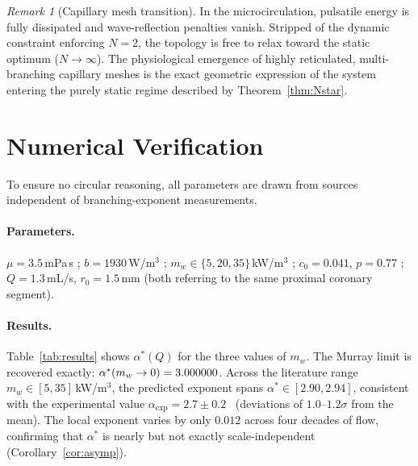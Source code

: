 \documentclass[11pt,a4paper]{article}
\theoremstyle{remark}
\newtheorem{remark}{Remark}
\begin{document}
\begin{remark}[Capillary mesh transition]
\label{rem:capillary_crossover}
In the microcirculation, pulsatile energy is fully dissipated and wave-reflection
penalties vanish. Stripped of the dynamic constraint enforcing $N=2$, the topology
is free to relax toward the static optimum ($N \to \infty$). The physiological
emergence of highly reticulated, multi-branching capillary meshes is the exact
geometric expression of the system entering the purely static regime described by
Theorem~\ref{thm:Nstar}.
\end{remark}

\section{Numerical Verification}
\label{sec:numerical}

To ensure no circular reasoning, all parameters are drawn from sources
independent of branching-exponent measurements.

\paragraph{Parameters.}
$\mu=3.5$\,mPa\,s \cite{Caro2012};
$b=1930$\,W/$\mathrm{m}^3$ \cite{Murray1926,Taber1998};
$m_w\in\{5,20,35\}$\,kW/$\mathrm{m}^3$ \cite{Paul1980};
$c_0=0.041$, $p=0.77$ \cite{Guo2003};
$Q=1.3$\,mL/s, $r_0=1.5$\,mm \cite{Kassab1993}
(both referring to the same proximal coronary segment).

\paragraph{Results.}
Table~\ref{tab:results} shows $\alpha^*(Q)$ for the three values of $m_w$.
The Murray limit is recovered exactly: $\alpha^*(m_w\to0)=3.000000$.
Across the literature range $m_w\in[5,35]$\,kW/$\mathrm{m}^3$,
the predicted exponent spans $\alpha^*\in[2.90,2.94]$,
consistent with the experimental value
$\alpha_\mathrm{exp}=2.7\pm0.2$~\cite{Kassab1993}
(deviations of $1.0$--$1.2\sigma$ from the mean).
The local exponent varies by only $0.012$ across four decades of flow,
confirming that $\alpha^*$ is nearly but not exactly scale-independent
(Corollary~\ref{cor:asymp}).
\end{document}
